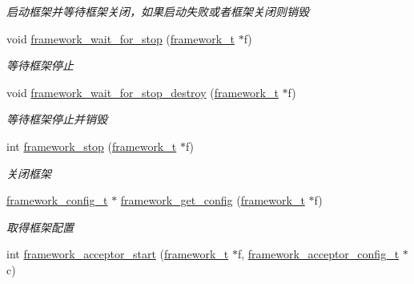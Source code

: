 \begin{DoxyCompactItemize}
\begin{DoxyCompactList}\small\item\em 启动框架并等待框架关闭，如果启动失败或者框架关闭则销毁 \end{DoxyCompactList}\item 
void \hyperlink{a00103_gaefec7da1b548ddb97c73c8924ba17069_gaefec7da1b548ddb97c73c8924ba17069}{framework\+\_\+wait\+\_\+for\+\_\+stop} (\hyperlink{a00051_a6149d769f6f07ed14a40a271c95d8463_a6149d769f6f07ed14a40a271c95d8463}{framework\+\_\+t} $\ast$f)
\begin{DoxyCompactList}\small\item\em 等待框架停止 \end{DoxyCompactList}\item 
void \hyperlink{a00103_gada1de96de1586411c77b5357a7b2376a_gada1de96de1586411c77b5357a7b2376a}{framework\+\_\+wait\+\_\+for\+\_\+stop\+\_\+destroy} (\hyperlink{a00051_a6149d769f6f07ed14a40a271c95d8463_a6149d769f6f07ed14a40a271c95d8463}{framework\+\_\+t} $\ast$f)
\begin{DoxyCompactList}\small\item\em 等待框架停止并销毁 \end{DoxyCompactList}\item 
int \hyperlink{a00103_ga429be76d09278d6170f1b519f4dbb689_ga429be76d09278d6170f1b519f4dbb689}{framework\+\_\+stop} (\hyperlink{a00051_a6149d769f6f07ed14a40a271c95d8463_a6149d769f6f07ed14a40a271c95d8463}{framework\+\_\+t} $\ast$f)
\begin{DoxyCompactList}\small\item\em 关闭框架 \end{DoxyCompactList}\item 
\hyperlink{a00051_a55b26efa9e6ee05514d087ba2593a54b_a55b26efa9e6ee05514d087ba2593a54b}{framework\+\_\+config\+\_\+t} $\ast$ \hyperlink{a00103_gaf0524cc257c8e57ba11d676dcca6bf64_gaf0524cc257c8e57ba11d676dcca6bf64}{framework\+\_\+get\+\_\+config} (\hyperlink{a00051_a6149d769f6f07ed14a40a271c95d8463_a6149d769f6f07ed14a40a271c95d8463}{framework\+\_\+t} $\ast$f)
\begin{DoxyCompactList}\small\item\em 取得框架配置 \end{DoxyCompactList}\item 
int \hyperlink{a00103_ga53ad108c8d70f15e9d31408f0d2dece1_ga53ad108c8d70f15e9d31408f0d2dece1}{framework\+\_\+acceptor\+\_\+start} (\hyperlink{a00051_a6149d769f6f07ed14a40a271c95d8463_a6149d769f6f07ed14a40a271c95d8463}{framework\+\_\+t} $\ast$f, \hyperlink{a00051_a61a4e424ff4c86631423dedd97c40064_a61a4e424ff4c86631423dedd97c40064}{framework\+\_\+acceptor\+\_\+config\+\_\+t} $\ast$c)

\end{DoxyCompactItemize}
